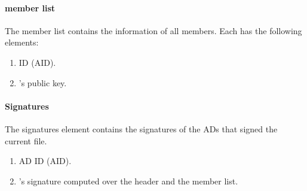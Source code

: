 \paragraph{\ISDC member list}
The \ISDC member list contains the information of all \ISDC members. Each \AD has the following elements:
\begin{enumerate}
\item \AD ID (AID).
\item \AD's public key.
\end{enumerate}

\paragraph{Signatures}
The signatures element contains the signatures of the \ISDC ADs that signed the current \RT file.
\begin{enumerate}
\item AD ID (AID).
\item \AD's signature computed over the header and the \ISDC member list.
\end{enumerate}

